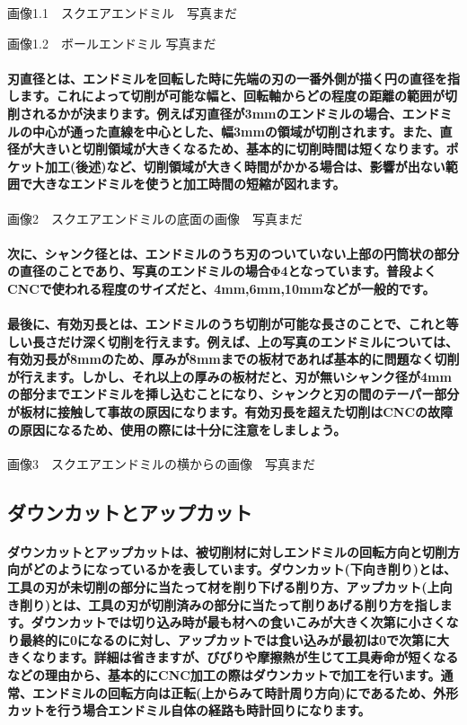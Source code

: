 \documentclass[b5paper, 9pt, twocolumn, titlepage,openany]{jsbook}%
\begin{document}
画像1.1　スクエアエンドミル　写真まだ

画像1.2　ボールエンドミル 写真まだ

\paragraph{刃直径とは、エンドミルを回転した時に先端の刃の一番外側が描く円の直径を指します。これによって切削が可能な幅と、回転軸からどの程度の距離の範囲が切削されるかが決まります。例えば刃直径が3mmのエンドミルの場合、エンドミルの中心が通った直線を中心とした、幅3mmの領域が切削されます。また、直径が大きいと切削領域が大きくなるため、基本的に切削時間は短くなります。ポケット加工(後述)など、切削領域が大きく時間がかかる場合は、影響が出ない範囲で大きなエンドミルを使うと加工時間の短縮が図れます。}

画像2　スクエアエンドミルの底面の画像　写真まだ

\paragraph{次に、シャンク径とは、エンドミルのうち刃のついていない上部の円筒状の部分の直径のことであり、写真のエンドミルの場合Φ4となっています。普段よくCNCで使われる程度のサイズだと、4mm,6mm,10mmなどが一般的です。}
\paragraph{最後に、有効刃長とは、エンドミルのうち切削が可能な長さのことで、これと等しい長さだけ深く切削を行えます。例えば、上の写真のエンドミルについては、有効刃長が8mmのため、厚みが8mmまでの板材であれば基本的に問題なく切削が行えます。しかし、それ以上の厚みの板材だと、刃が無いシャンク径が4mmの部分までエンドミルを挿し込むことになり、シャンクと刃の間のテーパー部分が板材に接触して事故の原因になります。有効刃長を超えた切削はCNCの故障の原因になるため、使用の際には十分に注意をしましょう。}

画像3　スクエアエンドミルの横からの画像　写真まだ

\subsection{ダウンカットとアップカット}

\paragraph{ダウンカットとアップカットは、被切削材に対しエンドミルの回転方向と切削方向がどのようになっているかを表しています。ダウンカット(下向き削り)とは、工具の刃が未切削の部分に当たって材を削り下げる削り方、アップカット(上向き削り)とは、工具の刃が切削済みの部分に当たって削りあげる削り方を指します。ダウンカットでは切り込み時が最も材への食いこみが大きく次第に小さくなり最終的に0になるのに対し、アップカットでは食い込みが最初は0で次第に大きくなります。詳細は省きますが、びびりや摩擦熱が生じて工具寿命が短くなるなどの理由から、基本的にCNC加工の際はダウンカットで加工を行います。通常、エンドミルの回転方向は正転(上からみて時計周り方向)にであるため、外形カットを行う場合エンドミル自体の経路も時計回りになります。}
\end{document}
